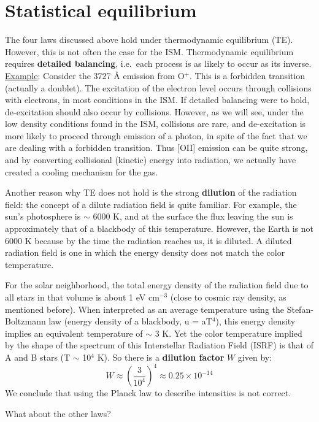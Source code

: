 \documentclass[12pt]{article}
\newcommand{\mar}[1]{\hspace{0pt}\marginpar{-\textcolor{black}{#1}-}}
\begin{document}
\section{Statistical equilibrium}
\textcolor{bred}{The\mar{19} four laws discussed above hold under
thermodynamic equilibrium (TE).}
However, this is not often the case for the ISM\@.
Thermodynamic equilibrium requires \textbf{detailed balancing},
i.e.\ each process is as likely to occur as its inverse.
\underline{Example}: Consider the 3727 \AA{} emission from O$^{+}$. This is
a forbidden transition (actually a doublet). The excitation of the electron
level occurs through collisions with electrons, in most conditions in the
ISM\@. If detailed balancing were to hold, de-excitation should also occur
by collisions. However, as we will see, under the low density conditions
found in the ISM, collisions are rare, and de-excitation is more likely to
proceed through emission of a photon, in spite of the fact that we are
dealing with a forbidden transition. Thus [OII] emission can be quite strong,
and by converting collisional (kinetic) energy into radiation, we actually have
created a cooling mechanism for the gas.

Another reason why TE does not hold is the strong \textbf{dilution} of
the radiation field: the concept of a dilute radiation field is quite familiar.
For example, the sun's photosphere is $\sim$ 6000 K, and at the surface the
flux leaving the sun is approximately that of a blackbody of this temperature.
However, the Earth is not 6000 K because by the time the radiation reaches us,
it is diluted. \textcolor{bred}{A diluted radiation field is one in which
the energy density does not match the color temperature.}

For \mar{20}the solar neighborhood, the total energy density of the
radiation field due to all stars in that volume is about 1 eV cm$^{-3}$
(close to cosmic ray density, as mentioned before). When interpreted as an
average temperature using the Stefan-Boltzmann law (energy density of a
blackbody, u = aT$^{4}$), this energy density implies an equivalent temperature
of $\sim$ 3 K. Yet the color temperature implied by the shape of the spectrum
of this Interstellar Radiation Field (ISRF) is that of A and B stars
(T $\sim$ 10$^{4}$ K). So there is a \textbf{dilution factor} $W$ given by:
$${ W \approx (\frac{3}{10^{4}})^{4} \approx 0.25\times10^{-14}
}$$
We conclude that using the Planck law to describe intensities is not correct.

What about the other laws?
\end{document}
